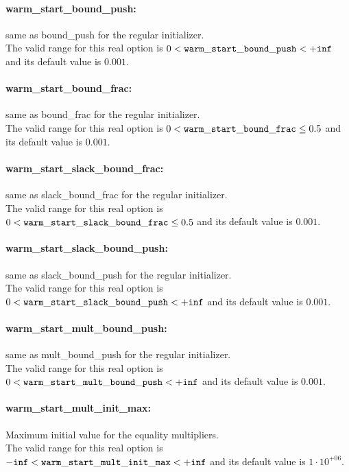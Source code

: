 \paragraph{warm\_start\_bound\_push:} same as bound\_push for the regular initializer. $\;$ \\
 The valid range for this real option is 
$0 <  {\tt warm\_start\_bound\_push } <  {\tt +inf}$
and its default value is $0.001$.


\paragraph{warm\_start\_bound\_frac:} same as bound\_frac for the regular initializer. $\;$ \\
 The valid range for this real option is 
$0 <  {\tt warm\_start\_bound\_frac } \le 0.5$
and its default value is $0.001$.


\paragraph{warm\_start\_slack\_bound\_frac:} same as slack\_bound\_frac for the regular initializer. $\;$ \\
 The valid range for this real option is 
$0 <  {\tt warm\_start\_slack\_bound\_frac } \le 0.5$
and its default value is $0.001$.


\paragraph{warm\_start\_slack\_bound\_push:} same as slack\_bound\_push for the regular initializer. $\;$ \\
 The valid range for this real option is 
$0 <  {\tt warm\_start\_slack\_bound\_push } <  {\tt +inf}$
and its default value is $0.001$.


\paragraph{warm\_start\_mult\_bound\_push:} same as mult\_bound\_push for the regular initializer. $\;$ \\
 The valid range for this real option is 
$0 <  {\tt warm\_start\_mult\_bound\_push } <  {\tt +inf}$
and its default value is $0.001$.


\paragraph{warm\_start\_mult\_init\_max:} Maximum initial value for the equality multipliers. $\;$ \\
 The valid range for this real option is 
${\tt -inf} <  {\tt warm\_start\_mult\_init\_max } <  {\tt +inf}$
and its default value is $1 \cdot 10^{+06}$.

